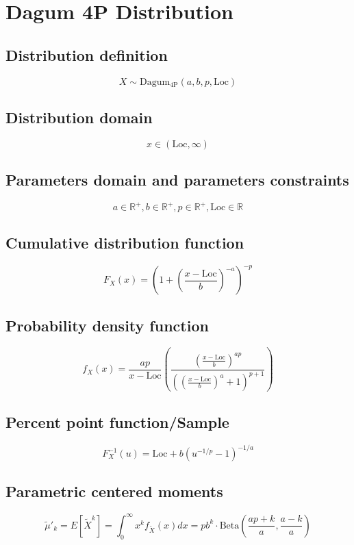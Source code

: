 \documentclass{article}
\begin{document}
\newpage
\section{Dagum 4P Distribution}
\subsection{Distribution definition}
\begin{equation*} X\sim\mathrm{Dagum_{4P}}\left(a,b,p,\text{Loc}\right) \end{equation*}
\subsection{Distribution domain}
\begin{equation*} x\in\left(\text{Loc},\infty\right) \end{equation*}
\subsection{Parameters domain and parameters constraints}
\begin{equation*} a\in\mathbb{R}^{+}, b\in\mathbb{R}^{+}, p\in\mathbb{R}^{+}, \text{Loc}\in\mathbb{R} \end{equation*}
\subsection{Cumulative distribution function}
\begin{equation*} F_{X}\left(x\right)={\left(1+{\left(\frac{x-\text{Loc}}{b}\right)}^{-a}\right)}^{-p} \end{equation*}
\subsection{Probability density function}
\begin{equation*} f_{X}\left(x\right)=\frac{a p}{x-\text{Loc}}\left(\frac{(\tfrac{x-\text{Loc}}{b})^{a p}}{\left((\tfrac{x-\text{Loc}}{b})^a+1\right)^{p+1}}\right) \end{equation*}
\subsection{Percent point function/Sample}
\begin{equation*} F^{-1}_{X}\left(u\right)=\text{Loc}+b(u^{-1/p}-1)^{-1/a} \end{equation*}
\subsection{Parametric centered moments}
\begin{equation*} \tilde{\mu}'_{k}=E[\tilde{X}^k]=\int_{0}^{\infty}x^{k}f_{\tilde{X}}\left(x\right)dx=pb^{k}\cdot \text{Beta}\left(\frac{ap+k}{a},\frac{a-k}{a}\right) \end{equation*}
\end{document}
